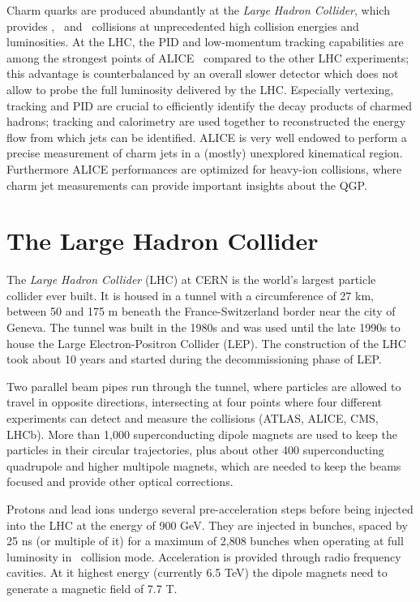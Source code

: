 \documentclass[12pt, a4paper, twoside, titlepage]{article}
\begin{document}
Charm quarks are produced abundantly at the \emph{Large Hadron Collider}, which provides \pp, \pPb\ and \PbPb\ collisions at unprecedented high collision energies and luminosities.
At the LHC, the PID and low-momentum tracking capabilities are among the strongest points of ALICE~\cite{} compared to the other LHC experiments; 
this advantage is counterbalanced by an overall slower detector which does not allow to probe the full luminosity delivered by the LHC. 
Especially vertexing, tracking and PID are crucial to efficiently identify the decay products of charmed hadrons; tracking and calorimetry are used together to reconstructed the energy flow from which jets can be identified.
ALICE is very well endowed to perform a precise measurement of charm jets in a (mostly) unexplored kinematical region. Furthermore ALICE performances
are optimized for heavy-ion collisions, where charm jet measurements can provide important insights about the QGP.

\section{The Large Hadron Collider}
The \emph{Large Hadron Collider} (LHC) at CERN is the world's largest particle collider ever built.
It is housed in a tunnel with a circumference of 27 km, between 50 and 175 m beneath
the France-Switzerland border near the city of Geneva. The tunnel was built in the 1980s and was used until 
the late 1990s to house the Large Electron-Positron Collider (LEP). The construction of the LHC took about 10 years and started
during the decommissioning phase of LEP. 

Two parallel beam pipes run through the tunnel,
where particles are allowed to travel in opposite directions, intersecting at four points where four different experiments
can detect and measure the collisions (\mbox{ATLAS}, \mbox{ALICE}, \mbox{CMS}, \mbox{LHCb}). More than 1,000 superconducting dipole magnets
are used to keep the particles in their circular trajectories, plus about other 400 superconducting quadrupole and higher multipole
magnets, which are needed to keep the beams focused and provide other optical corrections.

Protons and lead ions undergo several pre-acceleration steps before being injected into the LHC at the energy of 900 GeV.
They are injected in bunches, spaced by 25 ns (or multiple of it) for a maximum of 2,808 bunches when operating at full luminosity in \pp\ collision mode.
Acceleration is provided through radio frequency cavities. At it highest energy (currently 6.5 TeV) the dipole magnets need to generate
a magnetic field of 7.7 T.
\end{document}
